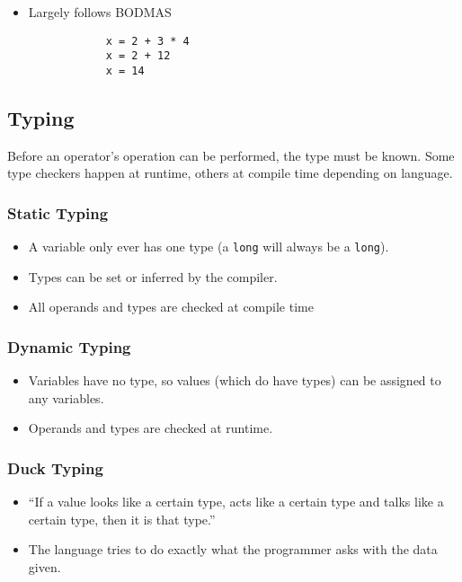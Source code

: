 \begin{itemize}
	\item Largely follows BODMAS
	      \begin{verbatim}
            x = 2 + 3 * 4
            x = 2 + 12
            x = 14
        \end{verbatim}
\end{itemize}

\subsection{Typing}\label{sub:typing}

Before an operator's operation can be performed, the type must be known.
Some type checkers happen at runtime, others at compile time depending on language.

\subsubsection{Static Typing}\label{ssub:static-typing}

\begin{itemize}
	\item A variable only ever has one type (a \texttt{long} will always be a \texttt{long}).
	\item Types can be set or inferred by the compiler.
	\item All operands and types are checked at compile time
\end{itemize}

\subsubsection{Dynamic Typing}\label{ssub:dynamic-typing}

\begin{itemize}
	\item Variables have no type, so values (which do have types) can be assigned to any variables.
	\item Operands and types are checked at runtime.
\end{itemize}

\subsubsection{Duck Typing}\label{ssub:duck-typing}

\begin{itemize}
	\item ``If a value looks like a certain type, acts like a certain type and talks like a certain type, then it is that type.''
	\item The language tries to do exactly what the programmer asks with the data given.
\end{itemize}

